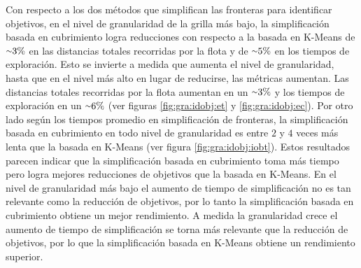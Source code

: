 Con respecto a los dos métodos que simplifican las fronteras para 
identificar objetivos, en el nivel de granularidad de la grilla más bajo, la
simplificación basada en cubrimiento logra reducciones con respecto a la
basada en K-Means de ${\smallsim}3\%$ en las distancias totales recorridas por la
flota y de ${\smallsim}5\%$ en los tiempos de exploración. Esto se invierte a
medida que aumenta el nivel de granularidad, hasta que en el nivel más alto en
lugar de reducirse, las métricas aumentan. Las distancias totales recorridas por la
flota aumentan en un ${\smallsim}3\%$ y los tiempos de exploración en un
${\smallsim}6\%$ (ver figuras \ref{fig:gra:idobj:et} y \ref{fig:gra:idobj:ec}). Por otro lado según los tiempos
promedio en simplificación de fronteras, la simplificación basada en
cubrimiento en todo nivel de granularidad es entre $2$ y
$4$ veces más lenta que la basada en K-Means (ver figura \ref{fig:gra:idobj:iobt}). Estos resultados
parecen indicar que la simplificación basada en cubrimiento toma más tiempo
pero logra mejores reducciones de objetivos que la basada en K-Means. En el
nivel de granularidad más bajo el aumento de tiempo de simplificación no es tan
relevante como la reducción de objetivos, por lo tanto la simplificación basada
en cubrimiento obtiene un mejor rendimiento. A medida la granularidad crece el
aumento de tiempo de simplificación se torna más relevante que la reducción de
objetivos, por lo que la simplificación basada en K-Means obtiene un
rendimiento superior.  

